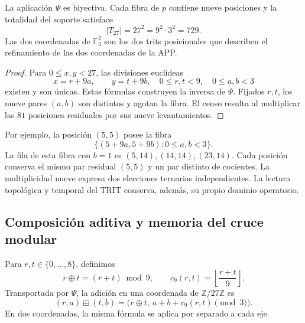 \begin{proposition}
\label{prop:app-refinamiento-fibras}
La aplicación $\Psi$ es biyectiva. Cada fibra de $p$ contiene nueve
posiciones y la totalidad del soporte satisface
\[
 |T_{27}|=27^2=9^2\cdot3^2=729.
\]
Las dos coordenadas de $\mathbb F_3^2$ son los dos trits posicionales
que describen el refinamiento de las dos coordenadas de la APP.
\end{proposition}
\begin{proof}
Para $0\leq x,y<27$, las divisiones euclídeas
\[
 x=r+9a,\qquad y=t+9b,
 \quad 0\leq r,t<9,\quad0\leq a,b<3
\]
existen y son únicas. Estas fórmulas construyen la inversa de $\Psi$.
Fijados $r,t$, los nueve pares $(a,b)$ son distintos y agotan la
fibra. El censo resulta al multiplicar las $81$ posiciones residuales
por sus nueve levantamientos.
\end{proof}

Por ejemplo, la posición $(5,5)$ posee la fibra
\[
 \{(5+9a,5+9b):0\leq a,b<3\}.
\]
La fila de esta fibra con $b=1$ es
$(5,14),(14,14),(23,14)$. Cada posición conserva el mismo par residual
$(5,5)$ y un par distinto de cocientes. La multiplicidad nueve expresa
dos elecciones ternarias independientes. La lectura topológica y
temporal del TRIT conserva, además, su propio dominio operatorio.

\subsection{Composición aditiva y memoria del cruce modular}

Para $r,t\in\{0,\ldots,8\}$, definimos
\[
 r\oplus t=(r+t)\bmod9,\qquad
 c_9(r,t)=\left\lfloor\frac{r+t}{9}\right\rfloor.
\]
Transportada por $\Psi$, la adición en una coordenada de
$\mathbb Z/27\mathbb Z$ es
\begin{equation}
 (r,a)\boxplus(t,b)
   =\bigl(r\oplus t,\ a+b+c_9(r,t)\pmod3\bigr).
 \label{eq:app-refinamiento-adicion}
\end{equation}
En dos coordenadas, la misma fórmula se aplica por separado a cada eje.

